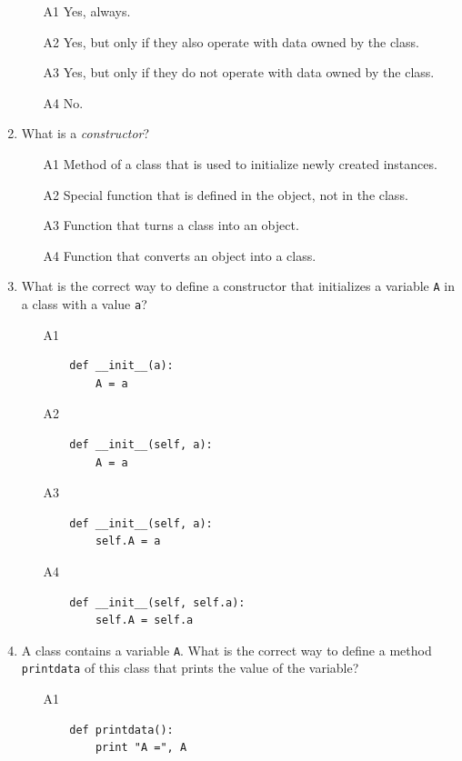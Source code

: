 \begin{enumerate}
\begin{enumerate}
\item[A1] Yes, always.
\item[A2] Yes, but only if they also operate with data owned by the class.
\item[A3] Yes, but only if they do not operate with data owned by the class.
\item[A4] No.
\end{enumerate}
\item What is a {\em constructor}?
\begin{enumerate}
\item[A1] Method of a class that is used to initialize newly created instances.
\item[A2] Special function that is defined in the object, not in the class.
\item[A3] Function that turns a class into an object.
\item[A4] Function that converts an object into a class.
\end{enumerate}
\item What is the correct way to define a constructor that initializes a variable
      {\tt A} in a class with a value {\tt a}?
\begin{enumerate}
\item[A1] 
\begin{verbatim}
    def __init__(a):
        A = a
\end{verbatim}
\item[A2] 
\begin{verbatim}
    def __init__(self, a):
        A = a
\end{verbatim}
\item[A3] 
\begin{verbatim}
    def __init__(self, a):
        self.A = a
\end{verbatim}
\item[A4] 
\begin{verbatim}
    def __init__(self, self.a):
        self.A = self.a
\end{verbatim}
\end{enumerate}
\item A class contains a variable {\tt A}. What is the correct way to define 
      a method {\tt printdata} of this class that prints the value of the variable?
\begin{enumerate}
\item[A1] 
\begin{verbatim}
    def printdata():
        print "A =", A

\end{verbatim}
\end{enumerate}
\end{enumerate}
